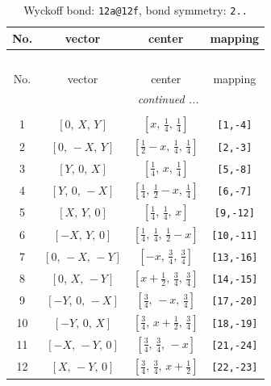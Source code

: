 \documentclass[fleqn,8pt]{jsarticle}
\begin{document}
\begin{longtable}{cccc}
\caption{Wyckoff bond: {\tt 12a@12f}, bond symmetry: {\tt 2..}}
 \\
 \hline \hline
No. & vector & center & mapping \\ \hline \endfirsthead

\multicolumn{3}{l}{\tablename\ \thetable{}} \\
 \hline \hline
No. & vector & center & mapping \\ \hline \endhead

 \hline \hline
\multicolumn{3}{r}{\footnotesize\it continued ...} \\ \endfoot

 \hline \hline
\multicolumn{3}{r}{} \\ \endlastfoot

1 & $\left[ 0,\, X,\, Y \right]$ & $\left[ x,\, \frac{1}{4},\, \frac{1}{4} \right]$ & {\tt [1,-4]} \\ \hline
2 & $\left[ 0,\, - X,\, Y \right]$ & $\left[ \frac{1}{2} - x,\, \frac{1}{4},\, \frac{1}{4} \right]$ & {\tt [2,-3]} \\ \hline
3 & $\left[ Y,\, 0,\, X \right]$ & $\left[ \frac{1}{4},\, x,\, \frac{1}{4} \right]$ & {\tt [5,-8]} \\ \hline
4 & $\left[ Y,\, 0,\, - X \right]$ & $\left[ \frac{1}{4},\, \frac{1}{2} - x,\, \frac{1}{4} \right]$ & {\tt [6,-7]} \\ \hline
5 & $\left[ X,\, Y,\, 0 \right]$ & $\left[ \frac{1}{4},\, \frac{1}{4},\, x \right]$ & {\tt [9,-12]} \\ \hline
6 & $\left[ - X,\, Y,\, 0 \right]$ & $\left[ \frac{1}{4},\, \frac{1}{4},\, \frac{1}{2} - x \right]$ & {\tt [10,-11]} \\ \hline
7 & $\left[ 0,\, - X,\, - Y \right]$ & $\left[ - x,\, \frac{3}{4},\, \frac{3}{4} \right]$ & {\tt [13,-16]} \\ \hline
8 & $\left[ 0,\, X,\, - Y \right]$ & $\left[ x + \frac{1}{2},\, \frac{3}{4},\, \frac{3}{4} \right]$ & {\tt [14,-15]} \\ \hline
9 & $\left[ - Y,\, 0,\, - X \right]$ & $\left[ \frac{3}{4},\, - x,\, \frac{3}{4} \right]$ & {\tt [17,-20]} \\ \hline
10 & $\left[ - Y,\, 0,\, X \right]$ & $\left[ \frac{3}{4},\, x + \frac{1}{2},\, \frac{3}{4} \right]$ & {\tt [18,-19]} \\ \hline
11 & $\left[ - X,\, - Y,\, 0 \right]$ & $\left[ \frac{3}{4},\, \frac{3}{4},\, - x \right]$ & {\tt [21,-24]} \\ \hline
12 & $\left[ X,\, - Y,\, 0 \right]$ & $\left[ \frac{3}{4},\, \frac{3}{4},\, x + \frac{1}{2} \right]$ & {\tt [22,-23]} \\
\end{longtable}
\end{document}
